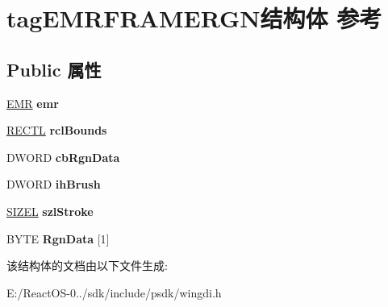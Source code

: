 \hypertarget{structtag_e_m_r_f_r_a_m_e_r_g_n}{}\section{tag\+E\+M\+R\+F\+R\+A\+M\+E\+R\+G\+N结构体 参考}
\label{structtag_e_m_r_f_r_a_m_e_r_g_n}
\subsection*{Public 属性}
\begin{DoxyCompactItemize}
\item 
\mbox{\label{structtag_e_m_r_f_r_a_m_e_r_g_n_a7ee9b51115c451a0e7e90ec508e3c249}} 
\hyperlink{structtag_e_m_r}{E\+MR} {\bfseries emr}
\item 
\mbox{\label{structtag_e_m_r_f_r_a_m_e_r_g_n_a4d44b21171d5288bec3ae84947e2f927}} 
\hyperlink{struct___r_e_c_t_l}{R\+E\+C\+TL} {\bfseries rcl\+Bounds}
\item 
\mbox{\label{structtag_e_m_r_f_r_a_m_e_r_g_n_ad68ea5ccf36aabda5769f80463334e7f}} 
D\+W\+O\+RD {\bfseries cb\+Rgn\+Data}
\item 
\mbox{\label{structtag_e_m_r_f_r_a_m_e_r_g_n_a783c50c6e61a33c5714f9d1f6f672490}} 
D\+W\+O\+RD {\bfseries ih\+Brush}
\item 
\mbox{\label{structtag_e_m_r_f_r_a_m_e_r_g_n_a10357193f034dd15943b1a63723a7f4f}} 
\hyperlink{structtag_s_i_z_e}{S\+I\+Z\+EL} {\bfseries szl\+Stroke}
\item 
\mbox{\label{structtag_e_m_r_f_r_a_m_e_r_g_n_ae69ff22254b54821fc51fbc015a8ab1c}} 
B\+Y\+TE {\bfseries Rgn\+Data} \mbox{[}1\mbox{]}
\end{DoxyCompactItemize}


该结构体的文档由以下文件生成\+:\begin{DoxyCompactItemize}
\item 
E\+:/\+React\+O\+S-\/0../sdk/include/psdk/wingdi.\+h\end{DoxyCompactItemize}
